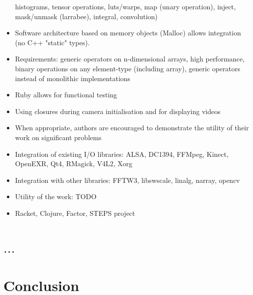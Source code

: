\documentclass[10pt,journal,compsoc]{joser1}
\begin{document}
\begin{footnotesize}
\begin{itemize}
    histograms, tensor operations, luts/warps, map (unary operation), inject,
    mask/unmask (larrabee), integral, convolution)
  \item Software architecture based on memory objects (Malloc) allows
    integration (no C++ "static" types).
  \item Requirements: generic operators on n-dimensional arrays, high
    performance, binary operations on any element-type (including array),
    generic operators instead of monolithic implementations
  \item Ruby allows for functional testing
  \item Using closures during camera initialisation and for displaying videos
  \item When appropriate, authors are encouraged to demonstrate the utility of
    their work on significant problems
  \item Integration of existing I/O libraries: ALSA, DC1394, FFMpeg, Kinect,
    OpenEXR, Qt4, RMagick, V4L2, Xorg
  \item Integration with other libraries: FFTW3, libswscale, linalg, narray,
    opencv
  \item Utility of the work: TODO
  \item Racket, Clojure, Factor, STEPS project
\end{itemize}
\end{footnotesize}

\section{$\ldots$}

\section{Conclusion}
\end{document}
